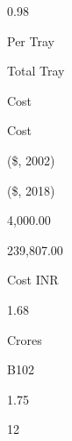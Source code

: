 \documentclass[a4paper,portrait,12pt]{article}
\begin{document}
0.98





\begin{flushleft}
Per Tray
\end{flushleft}





\begin{flushleft}
Total Tray
\end{flushleft}





\begin{flushleft}
Cost
\end{flushleft}





\begin{flushleft}
Cost
\end{flushleft}





(\$, 2002)





(\$, 2018)





4,000.00





239,807.00





\begin{flushleft}
Cost INR
\end{flushleft}





1.68


\begin{flushleft}
Crores
\end{flushleft}





\begin{flushleft}
B102
\end{flushleft}





1.75





12
\end{document}
